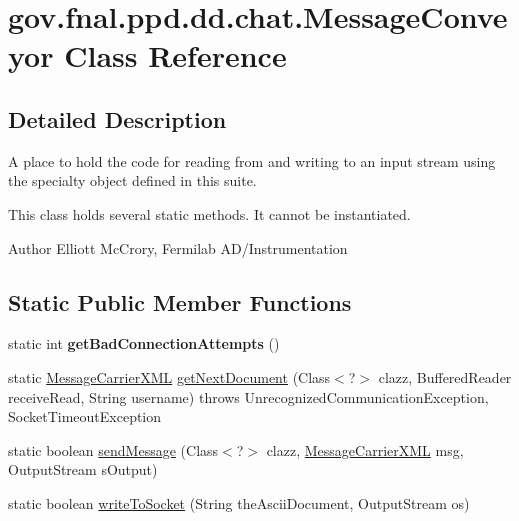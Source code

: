 \hypertarget{classgov_1_1fnal_1_1ppd_1_1dd_1_1chat_1_1MessageConveyor}{\section{gov.\-fnal.\-ppd.\-dd.\-chat.\-Message\-Conveyor Class Reference}
\label{classgov_1_1fnal_1_1ppd_1_1dd_1_1chat_1_1MessageConveyor}
}


\subsection{Detailed Description}
A place to hold the code for reading from and writing to an input stream using the specialty object defined in this suite.

This class holds several static methods. It cannot be instantiated.

\begin{DoxyAuthor}{Author}
Elliott Mc\-Crory, Fermilab A\-D/\-Instrumentation 
\end{DoxyAuthor}
\subsection*{Static Public Member Functions}
\begin{DoxyCompactItemize}
\item 
\hypertarget{classgov_1_1fnal_1_1ppd_1_1dd_1_1chat_1_1MessageConveyor_aebb7c15f246ede2ca14fc803978c7b7e}{static int {\bfseries get\-Bad\-Connection\-Attempts} ()}\label{classgov_1_1fnal_1_1ppd_1_1dd_1_1chat_1_1MessageConveyor_aebb7c15f246ede2ca14fc803978c7b7e}

\item 
static \hyperlink{classgov_1_1fnal_1_1ppd_1_1dd_1_1xml_1_1MessageCarrierXML}{Message\-Carrier\-X\-M\-L} \hyperlink{classgov_1_1fnal_1_1ppd_1_1dd_1_1chat_1_1MessageConveyor_ae56d91de80414057b1d55c555a188194}{get\-Next\-Document} (Class$<$?$>$ clazz, Buffered\-Reader receive\-Read, String username)  throws Unrecognized\-Communication\-Exception, Socket\-Timeout\-Exception 
\item 
static boolean \hyperlink{classgov_1_1fnal_1_1ppd_1_1dd_1_1chat_1_1MessageConveyor_ad75f4183546edf67ecc120cd4a763f5b}{send\-Message} (Class$<$?$>$ clazz, \hyperlink{classgov_1_1fnal_1_1ppd_1_1dd_1_1xml_1_1MessageCarrierXML}{Message\-Carrier\-X\-M\-L} msg, Output\-Stream s\-Output)
\item 
static boolean \hyperlink{classgov_1_1fnal_1_1ppd_1_1dd_1_1chat_1_1MessageConveyor_a3f948d3a9e2544f6ccd6fa371d1db792}{write\-To\-Socket} (String the\-Ascii\-Document, Output\-Stream os)
\end{DoxyCompactItemize}


